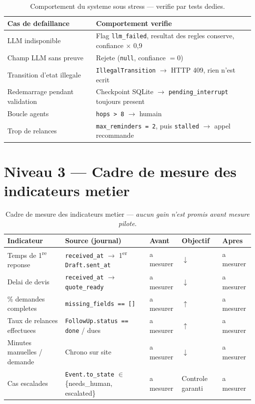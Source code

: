 \documentclass[12pt,a4paper,openany]{report}
\begin{document}
\begin{table}[H]\centering\small
\caption{Comportement du systeme sous stress --- verifie par tests dedies.}
\label{tab:robustesse}
\begin{tabularx}{\textwidth}{X X}\toprule
\rowcolor{boxOrange!30}\textbf{Cas de defaillance} & \textbf{Comportement verifie}\\\midrule
LLM indisponible               & Flag \texttt{llm\_failed}, resultat des regles conserve, confiance $\times$ 0{,}9\\
Champ LLM sans preuve          & Rejete (\texttt{null}, confiance $= 0$)\\
Transition d'etat illegale     & \texttt{IllegalTransition} $\rightarrow$ HTTP 409, rien n'est ecrit\\
Redemarrage pendant validation & Checkpoint SQLite $\rightarrow$ \texttt{pending\_interrupt} toujours present\\
Boucle agents                  & \texttt{hops > 8} $\rightarrow$ humain\\
Trop de relances               & \texttt{max\_reminders = 2}, puis \texttt{stalled} $\rightarrow$ appel recommande\\
\bottomrule
\end{tabularx}
\end{table}

\section{Niveau 3 --- Cadre de mesure des indicateurs metier}

\begin{table}[H]\centering\small
\caption{Cadre de mesure des indicateurs metier --- \emph{aucun gain n'est promis avant mesure pilote}.}
\label{tab:kpi}
\begin{tabularx}{\textwidth}{X l l l l}\toprule
\rowcolor{boxBlue!30}\textbf{Indicateur} & \textbf{Source (journal)} & \textbf{Avant} & \textbf{Objectif} & \textbf{Apres}\\\midrule
Temps de 1\textsuperscript{re} reponse   & \texttt{received\_at} $\rightarrow$ 1\textsuperscript{er} \texttt{Draft.sent\_at} & a mesurer & $\downarrow$ & a mesurer\\
Delai de devis                           & \texttt{received\_at} $\rightarrow$ \texttt{quote\_ready} & a mesurer & $\downarrow$ & a mesurer\\
\% demandes completes                    & \texttt{missing\_fields == []} & a mesurer & $\uparrow$ & a mesurer\\
Taux de relances effectuees              & \texttt{FollowUp.status == done} / dues & a mesurer & $\uparrow$ & a mesurer\\
Minutes manuelles / demande              & Chrono sur site & a mesurer & $\downarrow$ & a mesurer\\
Cas escalades                            & \texttt{Event.to\_state} $\in$ \{needs\_human, escalated\} & a mesurer & Controle garanti & a mesurer\\
\bottomrule
\end{tabularx}
\end{table}
\end{document}
